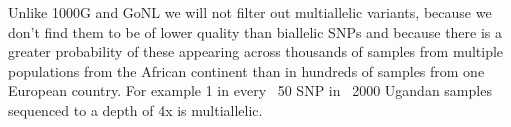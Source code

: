 

Unlike 1000G and GoNL we will not filter out multiallelic variants, because we don't find them to be of lower quality than biallelic SNPs and because there is a greater probability of these appearing across thousands of samples from multiple populations from the African continent than in hundreds of samples from one European country. For example 1 in every ~50 SNP in ~2000 Ugandan samples sequenced to a depth of 4x is multiallelic.
